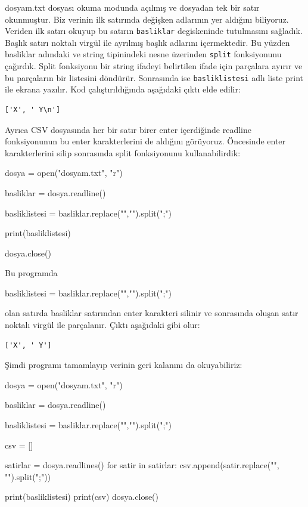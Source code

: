\documentclass[12pt]{report}
\begin{document}
dosyam.txt dosyası okuma modunda açılmış ve dosyadan tek bir satır okunmuştur. Biz verinin ilk satırında değişken adlarının yer aldığını biliyoruz. Veriden ilk satırı okuyup bu satırın \texttt{basliklar} degiskeninde tutulmasını sağladık. Başlık satırı noktalı virgül ile ayrılmış başlık adlarını içermektedir. Bu yüzden basliklar adındaki ve string tipinindeki nesne üzerinden \texttt{split} fonksiyonunu çağırdık. Split fonksiyonu bir string ifadeyi belirtilen ifade için parçalara ayırır ve bu parçaların bir listesini döndürür. Sonrasında ise \texttt{basliklistesi} adlı liste print ile ekrana yazılır. Kod çalıştırıldığında aşağıdaki çıktı elde edilir: 

\begin{verbatim}
['X', ' Y\n']
\end{verbatim}

Ayrıca CSV dosyasında her bir satır birer enter içerdiğinde readline fonksiyonunun bu enter karakterlerini de aldığını görüyoruz. Öncesinde enter karakterlerini silip sonrasında split fonksiyonunu kullanabilirdik:


\begin{python}
dosya = open("dosyam.txt", "r")

basliklar = dosya.readline()

basliklistesi = basliklar.replace("\n","").split(";")

print(basliklistesi)

dosya.close()
\end{python}

Bu programda

\begin{python}
basliklistesi = basliklar.replace("\n","").split(";")
\end{python}

olan satırda basliklar satırından enter karakteri silinir ve sonrasında oluşan satır noktalı virgül ile parçalanır. Çıktı aşağıdaki gibi olur:

\begin{verbatim}
['X', ' Y']
\end{verbatim}

Şimdi programı tamamlayıp verinin geri kalanını da okuyabiliriz:

\begin{python}
dosya = open("dosyam.txt", "r")

basliklar = dosya.readline()

basliklistesi = basliklar.replace("\n","").split(";")

csv = []

satirlar = dosya.readlines()
for satir in satirlar:
	csv.append(satir.replace("\n", "").split(";"))

print(basliklistesi)
print(csv)
dosya.close()
\end{python}
\end{document}
